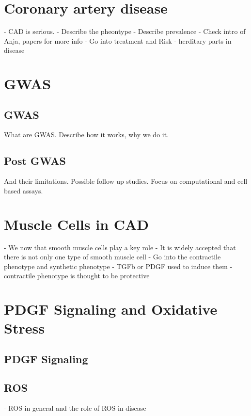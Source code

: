 \section{Coronary artery disease}
\label{sec:cad}
- CAD is serious.
- Describe the pheontype
- Describe prevalence
- Check intro of Anja, papers for more info
- Go into treatment and Risk
- herditary parts in disease

\section{GWAS}
\label{sec:gwas}

    \subsection{GWAS}
    \label{subsec:gwas_general}
    What are GWAS. Describe how it works, why we do it.

    \subsection{Post GWAS}
    \label{subsec:gwas_limit}
    And their limitations. Possible follow up studies. Focus on computational and cell based assays.

\section{Muscle Cells in CAD}
\label{sec:haosms}
- We now that smooth muscle cells play a key role
- It is widely accepted that there is not only one type of smooth muscle cell
- Go into the contractile phenotype and synthetic phenotype
    - TGFb or PDGF used to induce them
    - contractile phenotype is thought to be protective

\section{PDGF Signaling and Oxidative Stress}
\label{sec:haosms}
    \subsection{PDGF Signaling}
    \label{subsec:pdf_signaling}

    \subsection{ROS}
    \label{subsec:ROS}
    - ROS in general and the role of ROS in disease

